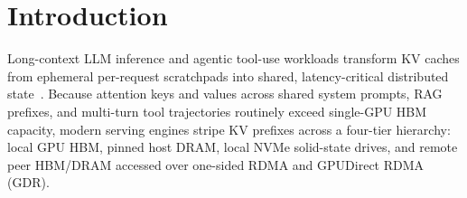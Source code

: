 \documentclass[11pt,a4paper]{article}
\let\origunderscore\_
\DeclareRobustCommand{\code}[1]{{\ttfamily\ifmmode #1\else\def\_{\origunderscore\hspace{0pt}}#1\fi}}
\newcommand{\VC}{\textsc{VeriCache}}
\newcommand{\MC}{\textsc{Mooncake}}
\newcommand{\LM}{\textsc{LMCache}}
\begin{document}
\begin{abstract}
Across the workspace, \textbf{1,210 verification items} (\textbf{69,764~LoC}) pass \emph{both} \code{Z3~4.16.0} and \code{CVC5~1.3.4} (\code{--no-cheating} enforced on \code{vericache-core}), gated by 10 \code{tree-sitter-verus} \code{ast-grep} structural checks that confine \code{unsafe} and \code{external\_body} to an exact \textbf{9-file, 2,151-LoC trusted computing base (3.0\% of system code)}. On dual NVIDIA H20 GPUs and BlueField-3 ConnectX-7 RoCEv2 hardware against production FAST'25 Kimi traces, \VC{} eliminates all 39 silent tearing corruptions exhibited by static-\code{rkey} RDMA under forced eviction, amortizes Type-2B \code{MW} isolation tax to \textbf{+9.9\%} at 4~MB and \textbf{+2.9\%} at 16~MB, scales to a \textbf{600~GiB 2-node 4-tier cluster} at \textbf{50.93--72.16~GB/s} (\textbf{1.57$\times$--2.07$\times$} faster than \MC{}~\code{0.3.14} and \textbf{3.83$\times$--4.31$\times$} faster than \LM{}~\code{0.5.7.post1}), and under a memory-constrained \textbf{160~GiB 4-tier NVMe-pressure profile} (\code{$\sim$380~GiB} \code{O\_DIRECT} \code{io\_uring} spills) sustains \textbf{9.93--14.61~GB/s} (\textbf{1.01$\times$--1.03$\times$} a zero-Python native Rust/C++ \MC{} driver, \textbf{1.08$\times$--1.10$\times$} \MC{}'s Python wheel, and \textbf{6.30$\times$--6.45$\times$} \LM{}) at \textbf{2.8$\times$--3.1$\times$} lower CPU utilization and zero leaked scratch files.
\end{abstract}

\tableofcontents
\clearpage

\section{Introduction}
\label{sec:intro}

Long-context LLM inference and agentic tool-use workloads transform KV caches from ephemeral per-request scratchpads into shared, latency-critical distributed state~\cite{vllm,mooncake,lmcache}. Because attention keys and values across shared system prompts, RAG prefixes, and multi-turn tool trajectories routinely exceed single-GPU HBM capacity, modern serving engines stripe KV prefixes across a four-tier hierarchy: local GPU HBM, pinned host DRAM, local NVMe solid-state drives, and remote peer HBM/DRAM accessed over one-sided RDMA and GPUDirect RDMA (GDR).
\end{document}

